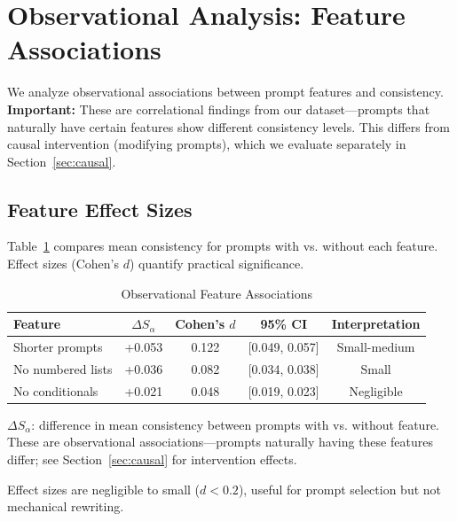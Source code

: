 \documentclass[sigconf,anonymous,review]{acmart}
\begin{document}
\section{Observational Analysis: Feature Associations}
\label{sec:observational}

We analyze observational associations between prompt features and consistency. \textbf{Important:} These are correlational findings from our dataset---prompts that naturally have certain features show different consistency levels. This differs from causal intervention (modifying prompts), which we evaluate separately in Section~\ref{sec:causal}.

\subsection{Feature Effect Sizes}

Table~\ref{tab:observational} compares mean consistency for prompts with vs. without each feature. Effect sizes (Cohen's $d$) quantify practical significance.

\begin{table}[t]
\centering
\caption{Observational Feature Associations}
\label{tab:observational}
\small
\begin{tabular}{@{}lcccc@{}}
\toprule
\textbf{Feature} & \textbf{$\Delta S_\alpha$} & \textbf{Cohen's $d$} & \textbf{95\% CI} & \textbf{Interpretation} \\
\midrule
Shorter prompts & +0.053 & 0.122 & [0.049, 0.057] & Small-medium \\
No numbered lists & +0.036 & 0.082 & [0.034, 0.038] & Small \\
No conditionals & +0.021 & 0.048 & [0.019, 0.023] & Negligible \\
\bottomrule
\end{tabular}
\vspace{0.3em}

\raggedright\footnotesize $\Delta S_\alpha$: difference in mean consistency between prompts with vs. without feature. These are observational associations---prompts naturally having these features differ; see Section~\ref{sec:causal} for intervention effects.
\end{table}

Effect sizes are negligible to small ($d < 0.2$), useful for prompt selection but not mechanical rewriting.
\end{document}
